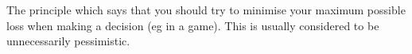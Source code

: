 The principle which says that you should try to
minimise your maximum possible loss when making 
a decision (eg in a game). This is usually considered
to be unnecessarily pessimistic.